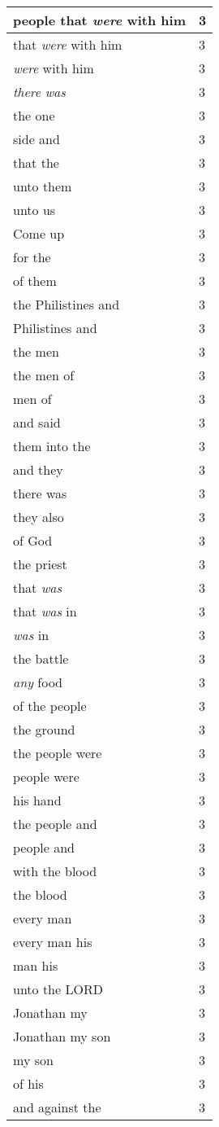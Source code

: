 \begin{center}
\begin{longtable}{|p{3.0in}|p{0.5in}|}
people that \emph{were} with him & 3\\ \hline 
that \emph{were} with him & 3\\ \hline 
\emph{were} with him & 3\\ \hline 
\emph{there} \emph{was} & 3\\ \hline 
the one & 3\\ \hline 
side and & 3\\ \hline 
that the & 3\\ \hline 
unto them & 3\\ \hline 
unto us & 3\\ \hline 
Come up & 3\\ \hline 
for the & 3\\ \hline 
of them & 3\\ \hline 
the Philistines and & 3\\ \hline 
Philistines and & 3\\ \hline 
the men & 3\\ \hline 
the men of & 3\\ \hline 
men of & 3\\ \hline 
and said & 3\\ \hline 
them into the & 3\\ \hline 
and they & 3\\ \hline 
there was & 3\\ \hline 
they also & 3\\ \hline 
of God & 3\\ \hline 
the priest & 3\\ \hline 
that \emph{was} & 3\\ \hline 
that \emph{was} in & 3\\ \hline 
\emph{was} in & 3\\ \hline 
the battle & 3\\ \hline 
\emph{any} food & 3\\ \hline 
of the people & 3\\ \hline 
the ground & 3\\ \hline 
the people were & 3\\ \hline 
people were & 3\\ \hline 
his hand & 3\\ \hline 
the people and & 3\\ \hline 
people and & 3\\ \hline 
with the blood & 3\\ \hline 
the blood & 3\\ \hline 
every man & 3\\ \hline 
every man his & 3\\ \hline 
man his & 3\\ \hline 
unto the LORD & 3\\ \hline 
Jonathan my & 3\\ \hline 
Jonathan my son & 3\\ \hline 
my son & 3\\ \hline 
of his & 3\\ \hline 
and against the & 3\\ \hline 
\end{longtable}
\end{center}





